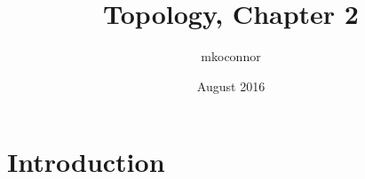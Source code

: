 \documentclass{article}
\title{Topology, Chapter 2}
\author{mkoconnor }
\date{August 2016}
\begin{document}
\maketitle

\section{Introduction}
\end{document}
